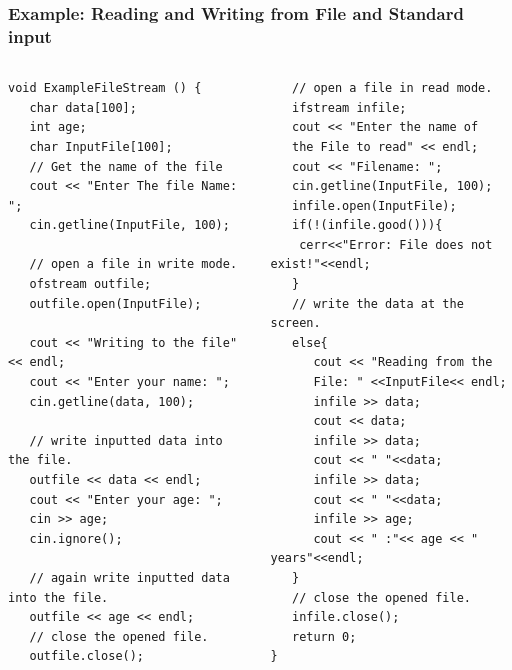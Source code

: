 \documentclass{beamer}
\begin{document}
\begin{frame}[fragile]
\frametitle{Example: Reading and Writing from File and Standard input}
\begin{columns}[t]


\begin{block}

\begin{tiny}

\begin{verbatim}
void ExampleFileStream () {
   char data[100];
   int age;
   char InputFile[100];
   // Get the name of the file
   cout << "Enter The file Name: "; 
   cin.getline(InputFile, 100);

   // open a file in write mode.
   ofstream outfile;
   outfile.open(InputFile);

   cout << "Writing to the file" << endl;
   cout << "Enter your name: "; 
   cin.getline(data, 100);

   // write inputted data into the file.
   outfile << data << endl;
   cout << "Enter your age: "; 
   cin >> age;
   cin.ignore();
   
   // again write inputted data into the file.
   outfile << age << endl;
   // close the opened file.
   outfile.close();
\end{verbatim}

\end{tiny}

\end{block}

\begin{block}

\begin{tiny}

\begin{verbatim}
   // open a file in read mode.
   ifstream infile; 
   cout << "Enter the name of 
   the File to read" << endl;
   cout << "Filename: "; 
   cin.getline(InputFile, 100);
   infile.open(InputFile); 
   if(!(infile.good())){
	cerr<<"Error: File does not exist!"<<endl;
   }
   // write the data at the screen.
   else{
   	  cout << "Reading from the 
   	  File: " <<InputFile<< endl; 
      infile >> data;
	  cout << data;
	  infile >> data;
	  cout << " "<<data;
	  infile >> data;
	  cout << " "<<data;
	  infile >> age;
	  cout << " :"<< age << " years"<<endl; 
   }
   // close the opened file.
   infile.close();
   return 0;
}
\end{verbatim}

\end{tiny}

\end{block}

\end{columns}

\end{frame}
\end{document}
